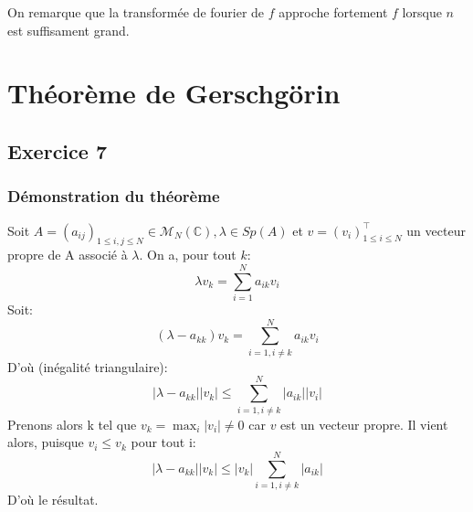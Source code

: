 \documentclass[a4paper,12pt]{article}
\begin{document}
\begin{figure}[h]
    \centering
    \hspace{0mm}
\end{figure}

On remarque que la transformée de fourier de $f$ approche fortement $f$ lorsque $n$ est suffisament grand.

\section{ Théorème de Gerschgörin}

\subsection{ Exercice 7}
\subsubsection{Démonstration du théorème}
Soit $A = (a_{ij})_{1 \leqslant i, j \leqslant N} \in \mathcal{M}_N(\mathbb{C}),
\lambda \in Sp(A)$  et $ v = (v_i)_{1 \leqslant i \leqslant N}^\intercal$ un vecteur propre de A
 associé à $\lambda$.
 On a, pour tout $k$:
 \begin{equation}
     \lambda v_k = \sum\limits_{i=1}^N a_{ik}v_i
 \end{equation}
 Soit:
 \begin{equation}
     (\lambda - a_{kk})v_k = \sum\limits_{i=1, i \neq k}^N a_{ik}v_i
 \end{equation}
 D'où (inégalité triangulaire):
 \begin{equation}
    |\lambda - a_{kk}||v_k| \leqslant \sum\limits_{i=1, i \neq k}^N |a_{ik}||v_i|
 \end{equation}
 Prenons alors k tel que $v_k = \max_{i} |v_i| \neq 0$ car $v$ est un vecteur propre.
 Il vient alors, puisque $v_i \leqslant v_k$ pour tout i:
 \begin{equation}
     |\lambda - a_{kk}||v_k| \leqslant |v_k|\sum\limits_{i=1, i \neq k}^N |a_{ik}|
 \end{equation}
D'où le résultat.
\end{document}

